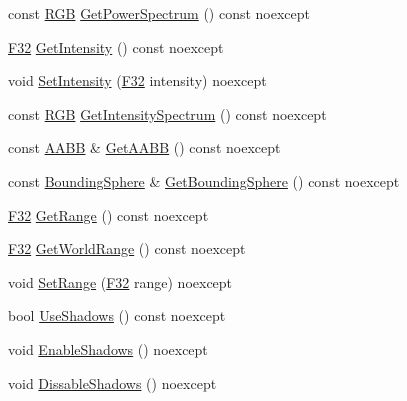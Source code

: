 \begin{DoxyCompactItemize}
\item 
const \mbox{\hyperlink{structmage_1_1_r_g_b}{R\+GB}} \mbox{\hyperlink{classmage_1_1rendering_1_1_omni_light_a82366151b99cc4791d8b361331f75833}{Get\+Power\+Spectrum}} () const noexcept
\item 
\mbox{\hyperlink{namespacemage_aa97e833b45f06d60a0a9c4fc22ae02c0}{F32}} \mbox{\hyperlink{classmage_1_1rendering_1_1_omni_light_ada51f74cdcf61ff29049d0a1fdf973c9}{Get\+Intensity}} () const noexcept
\item 
void \mbox{\hyperlink{classmage_1_1rendering_1_1_omni_light_aa2a936678bde1f957fd70207d2460d06}{Set\+Intensity}} (\mbox{\hyperlink{namespacemage_aa97e833b45f06d60a0a9c4fc22ae02c0}{F32}} intensity) noexcept
\item 
const \mbox{\hyperlink{structmage_1_1_r_g_b}{R\+GB}} \mbox{\hyperlink{classmage_1_1rendering_1_1_omni_light_a62247b6d7c2029ab906492049e858538}{Get\+Intensity\+Spectrum}} () const noexcept
\item 
const \mbox{\hyperlink{classmage_1_1_a_a_b_b}{A\+A\+BB}} \& \mbox{\hyperlink{classmage_1_1rendering_1_1_omni_light_aa3408de0d62c39d09e0b5aaccf61406a}{Get\+A\+A\+BB}} () const noexcept
\item 
const \mbox{\hyperlink{classmage_1_1_bounding_sphere}{Bounding\+Sphere}} \& \mbox{\hyperlink{classmage_1_1rendering_1_1_omni_light_aaecee74a14aae5015f8bc738727162ee}{Get\+Bounding\+Sphere}} () const noexcept
\item 
\mbox{\hyperlink{namespacemage_aa97e833b45f06d60a0a9c4fc22ae02c0}{F32}} \mbox{\hyperlink{classmage_1_1rendering_1_1_omni_light_af9bfc4b943b156756cd7c2323d93ebdd}{Get\+Range}} () const noexcept
\item 
\mbox{\hyperlink{namespacemage_aa97e833b45f06d60a0a9c4fc22ae02c0}{F32}} \mbox{\hyperlink{classmage_1_1rendering_1_1_omni_light_a7be27af3b3e5d11806396ce8f619223f}{Get\+World\+Range}} () const noexcept
\item 
void \mbox{\hyperlink{classmage_1_1rendering_1_1_omni_light_a71d9cbef05c421a154b202e7a9b8eedb}{Set\+Range}} (\mbox{\hyperlink{namespacemage_aa97e833b45f06d60a0a9c4fc22ae02c0}{F32}} range) noexcept
\item 
bool \mbox{\hyperlink{classmage_1_1rendering_1_1_omni_light_a7b4bd4cdd980feb3d841fff5947720e9}{Use\+Shadows}} () const noexcept
\item 
void \mbox{\hyperlink{classmage_1_1rendering_1_1_omni_light_a676a457b4e79b7dc74696acc713a9230}{Enable\+Shadows}} () noexcept
\item 
void \mbox{\hyperlink{classmage_1_1rendering_1_1_omni_light_a18eaf3b2683997854827b12ec26c9039}{Dissable\+Shadows}} () noexcept

\end{DoxyCompactItemize}
